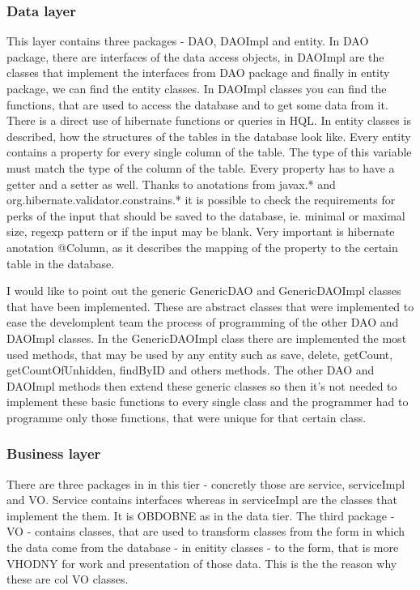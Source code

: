 \documentclass[thesis=B,english]{FITthesis}[2012/10/20]
\begin{document}
\subsubsection{Data layer}
This layer contains three packages - DAO, DAOImpl and entity. In DAO package, there are interfaces of the data access objects, in DAOImpl are the classes that implement the interfaces from DAO package and finally in entity package, we can find the entity classes.
In DAOImpl classes you can find the functions, that are used to access the database and to get some data from it. There is a direct use of hibernate functions or queries in HQL.
In entity classes is described, how the structures of the tables in the database look like. Every entity contains a property for every single column of the table. The type of this variable must match the type of the column of the table. Every property has to have a getter and a setter as well. Thanks to anotations from javax.* and org.hibernate.validator.constrains.* it is possible to check the requirements for perks of the input that should be saved to the database, ie. minimal or maximal size, regexp pattern or if the input may be blank. Very important is hibernate anotation @Column, as it describes the mapping of the property to the certain table in the database.

I would like to point out the generic GenericDAO and GenericDAOImpl classes that have been implemented.
These are abstract classes that were implemented to ease the develomplent team the process of programming of the other DAO and DAOImpl classes. In the GenericDAOImpl class there are implemented the most used methods, that may be used by any entity such as save, delete, getCount, getCountOfUnhidden, findByID and others methods. The other DAO and DAOImpl methods then extend these generic classes so then it's not needed to implement these basic functions to every single class and the programmer had to programme only those functions, that were unique for that certain class.
\subsubsection{Business layer}
There are three packages in in this tier - concretly those are service, serviceImpl and VO. Service contains interfaces whereas in serviceImpl are the classes that implement the them. It is OBDOBNE as in the data tier. The third package - VO - contains classes, that are used to transform classes from the form in which the data come from the database - in enitity classes - to the form, that is more VHODNY for work and presentation of those data. This is the the reason why these are col VO classes.
\end{document}
